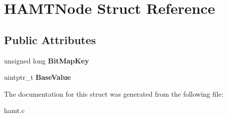 \hypertarget{struct_h_a_m_t_node}{\section{H\-A\-M\-T\-Node Struct Reference}
\label{struct_h_a_m_t_node}
}
\subsection*{Public Attributes}
\begin{DoxyCompactItemize}
\item 
\hypertarget{struct_h_a_m_t_node_a83836755e218c5c0d6017b4f9fdc6d6e}{unsigned long {\bfseries Bit\-Map\-Key}}\label{struct_h_a_m_t_node_a83836755e218c5c0d6017b4f9fdc6d6e}

\item 
\hypertarget{struct_h_a_m_t_node_afd2d3350770c3207dc7140b9eeb11d7d}{uintptr\-\_\-t {\bfseries Base\-Value}}\label{struct_h_a_m_t_node_afd2d3350770c3207dc7140b9eeb11d7d}

\end{DoxyCompactItemize}


The documentation for this struct was generated from the following file\-:\begin{DoxyCompactItemize}
\item 
hamt.\-c\end{DoxyCompactItemize}
